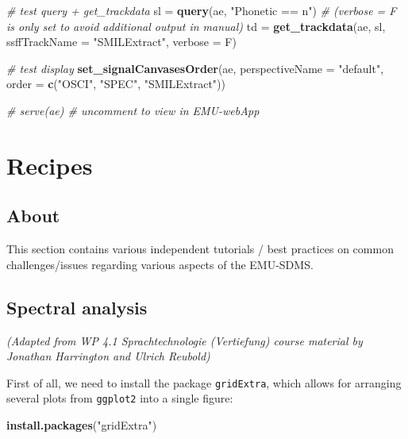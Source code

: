 \documentclass[]{book}
\newenvironment{Shaded}{\begin{snugshade}}{\end{snugshade}}
\newcommand{\CommentTok}[1]{\textcolor[rgb]{0.56,0.35,0.01}{\textit{#1}}}
\newcommand{\DataTypeTok}[1]{\textcolor[rgb]{0.13,0.29,0.53}{#1}}
\newcommand{\KeywordTok}[1]{\textcolor[rgb]{0.13,0.29,0.53}{\textbf{#1}}}
\newcommand{\NormalTok}[1]{#1}
\newcommand{\StringTok}[1]{\textcolor[rgb]{0.31,0.60,0.02}{#1}}
\begin{document}
\begin{Shaded}
\begin{Highlighting}[]
\CommentTok{# test query + get_trackdata}
\NormalTok{sl =}\StringTok{ }\KeywordTok{query}\NormalTok{(ae, }\StringTok{"Phonetic == n"}\NormalTok{)}
\CommentTok{# (verbose = F is only set to avoid additional output in manual)}
\NormalTok{td =}\StringTok{ }\KeywordTok{get_trackdata}\NormalTok{(ae,}
\NormalTok{                   sl,}
                   \DataTypeTok{ssffTrackName =} \StringTok{"SMILExtract"}\NormalTok{,}
                   \DataTypeTok{verbose =}\NormalTok{ F)}

\CommentTok{# test display}
\KeywordTok{set_signalCanvasesOrder}\NormalTok{(ae,}
                        \DataTypeTok{perspectiveName =} \StringTok{"default"}\NormalTok{,}
                        \DataTypeTok{order =} \KeywordTok{c}\NormalTok{(}\StringTok{"OSCI"}\NormalTok{, }\StringTok{"SPEC"}\NormalTok{, }\StringTok{"SMILExtract"}\NormalTok{))}

\CommentTok{# serve(ae) # uncomment to view in EMU-webApp}
\end{Highlighting}
\end{Shaded}

\hypertarget{part-recipes}{%
\part{Recipes}\label{part-recipes}}

\hypertarget{about}{%
\chapter{About}\label{about}}

This section contains various independent tutorials / best practices on common challenges/issues regarding various aspects of the EMU-SDMS.

\hypertarget{recipe:spectralAnalysis}{%
\chapter{Spectral analysis}\label{recipe:spectralAnalysis}}

\emph{(Adapted from WP 4.1 Sprachtechnologie (Vertiefung) course material by Jonathan Harrington and Ulrich Reubold)}

First of all, we need to install the package \texttt{gridExtra}, which allows for arranging several plots from \texttt{ggplot2} into a single figure:

\begin{Shaded}
\begin{Highlighting}[]
\KeywordTok{install.packages}\NormalTok{(}\StringTok{"gridExtra"}\NormalTok{)}
\end{Highlighting}
\end{Shaded}
\end{document}
